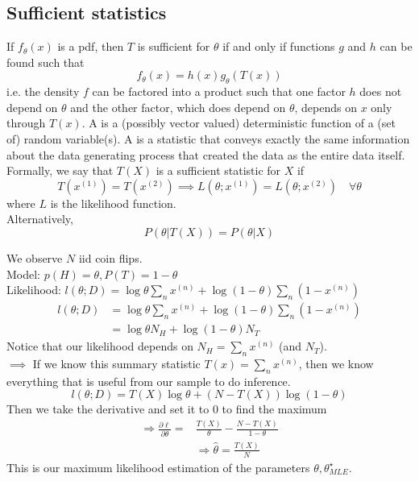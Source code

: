 \documentclass[11pt]{article}
\begin{document}
\subsection{Sufficient statistics}
If $f_\theta(x)$ is a pdf, then $T$ is sufficient for $\theta$ if and only if  functions $g$ and $h$ can be found such that
$$f_\theta(x) = h(x)g_\theta(T(x))$$
i.e. the density $f$ can be factored into a product such that one factor $h$ does not depend on $\theta$ and the other factor, which does depend on $\theta$, depends on $x$ only through $T(x)$.
A  is a (possibly vector valued) deterministic function of a (set of) random variable(s). A  is a statistic that conveys exactly the same information about the data generating process that created the data as the entire data itself. Formally, we say that $T(X)$ is a sufficient statistic for $X$ if
$$T(x^{(1)}) = T(x^{(2)}) \implies L(\theta; x^{(1)}) = L(\theta; x^{(2)}) \quad \forall \theta$$
where $L$ is the likelihood function. \\
Alternatively,
$$P(\theta | T(X)) = P(\theta|X)$$

We observe $N$ iid coin flips. \\
Model: $p(H) = \theta, P(T) = 1 - \theta$\\
Likelihood: $l(\theta; D) = \log \theta \sum_n x^{(n)} + \log (1-\theta) \sum_n (1 - x^{(n)})$\\
\begin{align*}
	l(\theta; D) &= \log \theta \sum_n x^{(n)} + \log (1-\theta) \sum_n (1 - x^{(n)})\\
	&= \log \theta N_H + \log(1-\theta)N_T
\end{align*}
Notice that our likelihood depends on $N_H = \sum_n x^{(n)}$ (and $N_T$).\\
$\implies$ If we know this summary statistic $T(x) = \sum_n x^{(n)}$, then we know everything that is useful from our sample to do inference.\\
$$l(\theta; D) = T(X)\log \theta + (N - T(X)) \log (1 - \theta)$$
Then we take the derivative and set it to 0 to find the maximum
\[
\begin{aligned}
\Rightarrow \frac{\partial \ell}{\partial \theta}=& \frac{T(X)}{\theta}-\frac{N-T(X)}{1-\theta} \\
& \Rightarrow \hat{\theta}=\frac{T(X)}{N}
\end{aligned}
\]
This is our maximum likelihood estimation of the parameters \(\theta, \theta_{M L E}^{\star}\).\\
\end{document}
